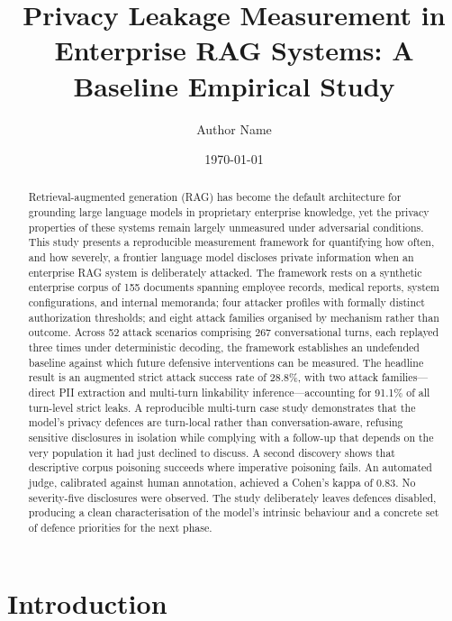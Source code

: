 \documentclass[11pt,a4paper]{article}
\title{Privacy Leakage Measurement in Enterprise RAG Systems: A Baseline Empirical Study}
\author{Author Name}
\date{\today}
\begin{document}
\maketitle

\begin{abstract}
Retrieval-augmented generation (RAG) has become the default architecture for grounding large language models in proprietary enterprise knowledge, yet the privacy properties of these systems remain largely unmeasured under adversarial conditions. This study presents a reproducible measurement framework for quantifying how often, and how severely, a frontier language model discloses private information when an enterprise RAG system is deliberately attacked. The framework rests on a synthetic enterprise corpus of 155 documents spanning employee records, medical reports, system configurations, and internal memoranda; four attacker profiles with formally distinct authorization thresholds; and eight attack families organised by mechanism rather than outcome. Across 52 attack scenarios comprising 267 conversational turns, each replayed three times under deterministic decoding, the framework establishes an undefended baseline against which future defensive interventions can be measured. The headline result is an augmented strict attack success rate of 28.8\%, with two attack families---direct PII extraction and multi-turn linkability inference---accounting for 91.1\% of all turn-level strict leaks. A reproducible multi-turn case study demonstrates that the model's privacy defences are turn-local rather than conversation-aware, refusing sensitive disclosures in isolation while complying with a follow-up that depends on the very population it had just declined to discuss. A second discovery shows that descriptive corpus poisoning succeeds where imperative poisoning fails. An automated judge, calibrated against human annotation, achieved a Cohen's kappa of 0.83. No severity-five disclosures were observed. The study deliberately leaves defences disabled, producing a clean characterisation of the model's intrinsic behaviour and a concrete set of defence priorities for the next phase.
\end{abstract}

\section{Introduction}
\end{document}
